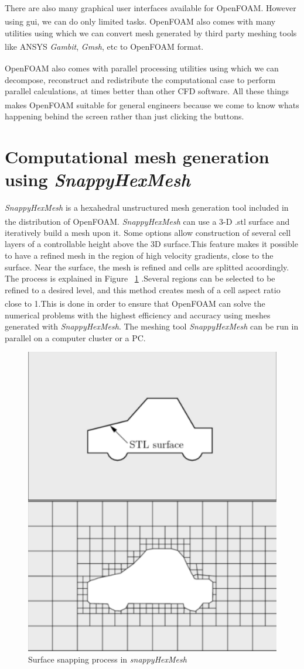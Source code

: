  

There are also many graphical user interfaces available for OpenFOAM\textsuperscript{\textregistered}. However using gui, we can do only limited tasks. OpenFOAM\textsuperscript{\textregistered} also comes with many utilities using which we can convert mesh generated by third party meshing tools like ANSYS\textsuperscript{\textregistered} \textit{Gambit}, \textit{Gmsh}, etc to OpenFOAM\textsuperscript{\textregistered} format.

OpenFOAM\textsuperscript{\textregistered} also comes with parallel processing utilities using which we can decompose, reconstruct and redistribute the computational case to perform parallel calculations, at times better than other CFD software. All these things makes OpenFOAM\textsuperscript{\textregistered} suitable for general engineers because we come to know whats happening behind the screen rather than just clicking the buttons. 


\section{Computational mesh generation using \textit{SnappyHexMesh}}

\textit{SnappyHexMesh} is a hexahedral unstructured mesh generation tool included in the distribution of OpenFOAM\textsuperscript{\textregistered}. \textit{SnappyHexMesh} can use a 3-D .stl surface and iteratively build a mesh upon it. Some options allow construction of several cell layers of a controllable height above the 3D surface.This feature makes it possible to have a refined mesh in the region of high velocity gradients, close to the surface.  Near the surface, the mesh is refined and cells are splitted acoordingly. The process is explained in Figure ~\ref{Snappy Hex Mesh} .Several regions can be selected to be refined to a desired level, and this method creates mesh of a cell aspect ratio close to 1.This is done in order to ensure that OpenFOAM\textsuperscript{\textregistered} can solve the numerical problems with the highest efficiency and accuracy using meshes generated with \textit{SnappyHexMesh}. The meshing tool \textit{SnappyHexMesh} can be run in parallel on a computer cluster or a PC.

\begin{figure}[H]
	\centering
	\includegraphics[width=180 pt]{mesh/snappyHexMesh.png}
	\caption{Surface snapping process in \textit{snappyHexMesh} }
	\label{Snappy Hex Mesh} %
\end{figure} 

